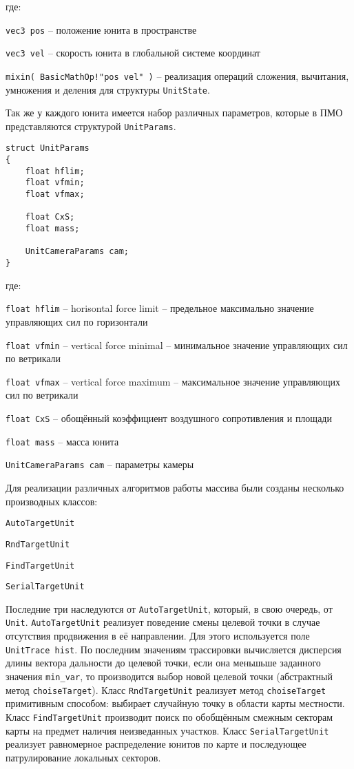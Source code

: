 где:

\verb|vec3 pos| -- положение юнита в пространстве

\verb|vec3 vel| -- скорость юнита в глобальной системе координат

\verb|mixin( BasicMathOp!"pos vel" )| -- реализация операций сложения,
вычитания, умножения и деления для структуры \verb|UnitState|.

Так же у каждого юнита имеется набор различных параметров, которые в
ПМО представляются структурой \verb|UnitParams|.

\begin{verbatim}
struct UnitParams
{
    float hflim;
    float vfmin;
    float vfmax;

    float CxS;
    float mass;

    UnitCameraParams cam;
}
\end{verbatim}

где: 

\verb|float hflim| -- horisontal force limit -- предельное максимально
значение управляющих сил по горизонтали

\verb|float vfmin| -- vertical force minimal -- минимальное значение
управляющих сил по ветрикали

\verb|float vfmax| -- vertical force maximum -- максимальное значение
управляющих сил по ветрикали

\verb|float CxS| -- обощённый коэффициент воздушного сопротивления и
площади

\verb|float mass| -- масса юнита

\verb|UnitCameraParams cam| -- параметры камеры

Для реализации различных алгоритмов работы массива были созданы несколько
производных классов:
\begin{mintemize}
\item \verb|AutoTargetUnit|
\item \verb|RndTargetUnit|
\item \verb|FindTargetUnit|
\item \verb|SerialTargetUnit|
\end{mintemize}

Последние три наследуются
от \verb|AutoTargetUnit|, который, в свою очередь, от \verb|Unit|.
\verb|AutoTargetUnit| реализует поведение смены целевой точки в случае
отсутствия продвижения в её направлении. Для этого используется поле
\verb|UnitTrace hist|. По последним значениям трассировки вычисляется
дисперсия длины вектора дальности до целевой точки, если она меньшьше
заданного значения \verb|min_var|, то производится выбор новой целевой
точки (абстрактный метод \verb|choiseTarget|). Класс \verb|RndTargetUnit|
реализует метод \verb|choiseTarget| примитивным способом: выбирает
случайную точку в области карты местности. Класс \verb|FindTargetUnit|
производит поиск по обобщённым смежным секторам карты на предмет наличия
неизведанных участков. Класс \verb|SerialTargetUnit| реализует равномерное
распределение юнитов по карте и последующее патрулирование локальных секторов.

